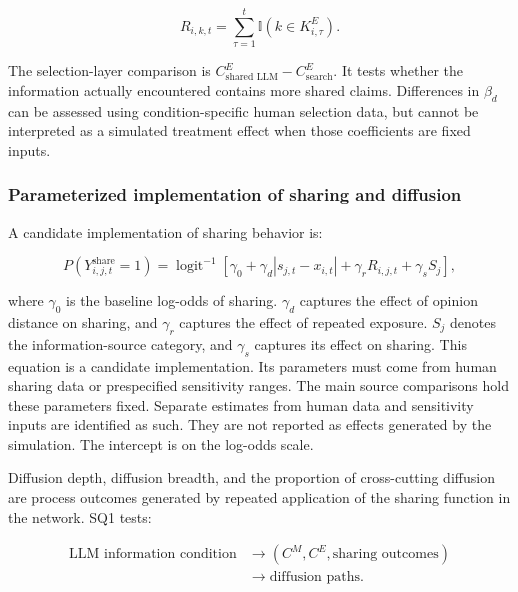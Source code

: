 \documentclass[11pt,a4paper]{article}
\begin{document}
\begin{equation*}
R_{i,k,t}
=
\sum_{\tau=1}^{t}
\mathbb I(k\in K^{E}_{i,\tau}).
\end{equation*}

The selection-layer comparison is $C^{E}_{\text{shared LLM}}-C^{E}_{\text{search}}$. It tests whether the information actually encountered contains more shared claims. Differences in $\beta_d$ can be assessed using condition-specific human selection data, but cannot be interpreted as a simulated treatment effect when those coefficients are fixed inputs.

\subsubsection{Parameterized implementation of sharing and diffusion}

A candidate implementation of sharing behavior is:

\begin{equation*}
P(Y_{i,j,t}^{\text{share}}=1)
=
\operatorname{logit}^{-1}
\left[
\gamma_0
+
\gamma_d|s_{j,t}-x_{i,t}|
+
\gamma_rR_{i,j,t}
+
\gamma_sS_j
\right],
\end{equation*}

where $\gamma_0$ is the baseline log-odds of sharing. $\gamma_d$ captures the effect of opinion distance on sharing, and $\gamma_r$ captures the effect of repeated exposure. $S_j$ denotes the information-source category, and $\gamma_s$ captures its effect on sharing. This equation is a candidate implementation. Its parameters must come from human sharing data or prespecified sensitivity ranges. The main source comparisons hold these parameters fixed. Separate estimates from human data and sensitivity inputs are identified as such. They are not reported as effects generated by the simulation. The intercept is on the log-odds scale.

Diffusion depth, diffusion breadth, and the proportion of cross-cutting diffusion are process outcomes generated by repeated application of the sharing function in the network. SQ1 tests:

\begin{equation*}
\begin{aligned}\text{LLM information condition} &\rightarrow \left( C^{M},C^{E},\text{sharing outcomes} \right) \\
&\rightarrow \text{diffusion paths}.\end{aligned}
\end{equation*}
\end{document}
